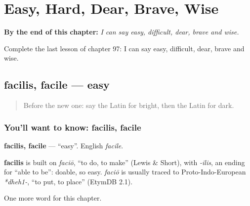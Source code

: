 
\chapter{Easy, Hard, Dear, Brave, Wise}
\label{ch:la-easy-hard-dear-brave-wise}

\begin{chapteropening}
\textbf{By the end of this chapter:} \emph{I can say easy, difficult, dear, brave and wise.}

Complete the last lesson of chapter 97: I can say easy, difficult, dear, brave and wise.
\end{chapteropening}

\section[facilis, facile]{facilis, facile — easy}

\label{lesson:LA-C97-facilis}



\begin{quote}
Before the new one: say the Latin for bright, then the Latin for dark.
\end{quote}

\subsection*{You'll want to know: facilis, facile}
\textbf{facilis, facile} — \textquotedblleft{}easy\textquotedblright{}. English \emph{facile}.

\begin{cousinweb}
\textbf{facilis} is built on \emph{faciō}, \textquotedblleft{}to do, to make\textquotedblright{} (Lewis \& Short), with \emph{-ilis}, an ending for \textquotedblleft{}able to be\textquotedblright{}: doable, so easy. \emph{faciō} is usually traced to Proto-Indo-European \emph{*dheh1-}, \textquotedblleft{}to put, to place\textquotedblright{} (EtymDB 2.1).
\end{cousinweb}

\begin{grammarlens}[title={What you've built}]
One more word for this chapter.
\end{grammarlens}

